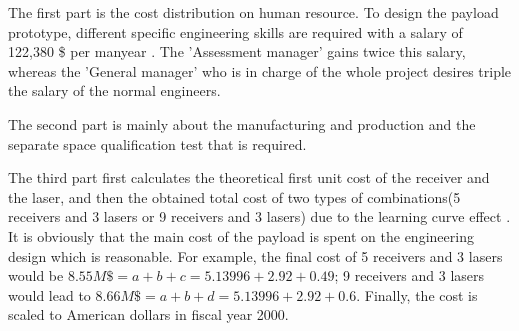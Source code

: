 The first part is the cost distribution on human resource. To design the payload prototype, different specific engineering skills are required with a salary of 122,380 \$ per manyear \cite{engineering_salary}. The 'Assessment manager' gains twice this salary, whereas the 'General manager' who is in charge of the whole project desires triple the salary of the normal engineers.

The second part is mainly about the manufacturing and production and the separate space qualification test that is required.

The third part first calculates the theoretical first unit cost of the receiver and the \acs{laser}, and then the obtained total cost of two types of combinations(5 receivers and 3 \acsp{laser} or 9 receivers and 3 \acsp{laser}) due to the learning curve effect \cite{Space2B}. It is obviously that the main cost of the payload is spent on the engineering design which is reasonable. For example, the final cost of 5 receivers and 3 \acsp{laser} would be $8.55 M\$ = a + b + c = 5.13996 + 2.92 + 0.49$; 9 receivers and 3 \acsp{laser} would lead to $8.66 M\$ = a + b + d = 5.13996 + 2.92 + 0.6$. Finally, the cost is scaled to American dollars in fiscal year 2000.


